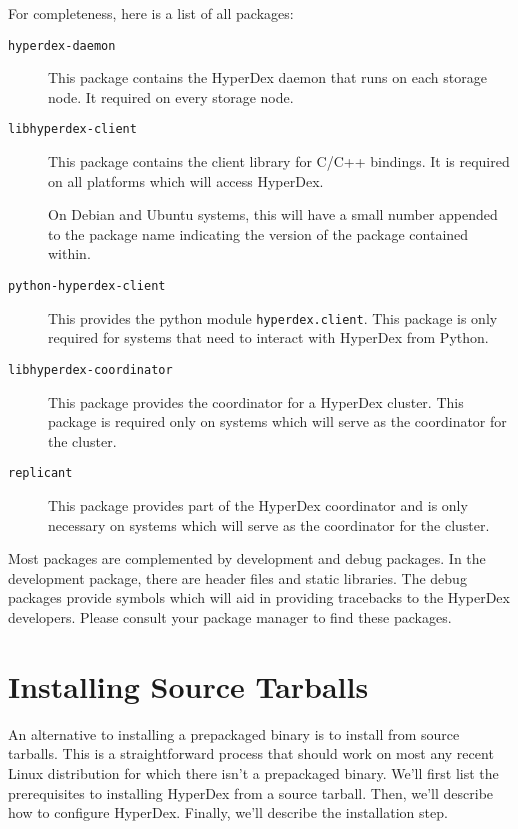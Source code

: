 For completeness, here is a list of all packages:

\begin{description}
\item[\texttt{hyperdex-daemon}]
This package contains the HyperDex daemon that runs on each storage node.  It
required on every storage node.

\item[\texttt{libhyperdex-client}]
This package contains the client library for C/C++ bindings.  It is required on
all platforms which will access HyperDex.

On Debian and Ubuntu systems, this will have a small number appended to the
package name indicating the version of the package contained within.

\item[\texttt{python-hyperdex-client}]
This provides the python module \texttt{hyperdex.client}.  This package is only
required for systems that need to interact with HyperDex from Python.

\item[\texttt{libhyperdex-coordinator}]
This package provides the coordinator for a HyperDex cluster.  This package is
required only on systems which will serve as the coordinator for the cluster.

\item[\texttt{replicant}]
This package provides part of the HyperDex coordinator and is only necessary on
systems which will serve as the coordinator for the cluster.
\end{description}

Most packages are complemented by development and debug packages.  In the
development package, there are header files and static libraries.  The debug
packages provide symbols which will aid in providing tracebacks to the HyperDex
developers.  Please consult your package manager to find these packages.

\section{Installing Source Tarballs}

An alternative to installing a prepackaged binary is to install from source
tarballs.  This is a straightforward process that should work on most any recent
Linux distribution for which there isn't a prepackaged binary.  We'll first list
the prerequisites to installing HyperDex from a source tarball.  Then, we'll
describe how to configure HyperDex.  Finally, we'll describe the installation
step.

